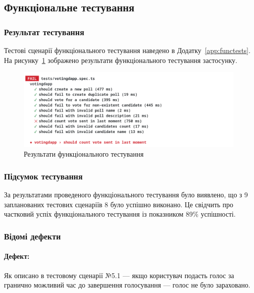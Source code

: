 \documentclass[14pt]{extreport}
\begin{document}
  \subsection{Функціональне тестування}
  
  \subsubsection*{Результат тестування}
  
  Тестові сценарії функціонального тестування наведено в Додатку~\ref{app:functests}. На рисунку~\ref{fig:functests} зображено результати функціонального тестування застосунку.

  \begin{figure}[H]
    \centering
    \includegraphics[width=\textwidth]{FuncTests}
    \caption{Результати функціонального тестування}
    \label{fig:functests}
  \end{figure}
  
  \subsubsection*{Підсумок тестування}
  
  За результатами проведеного функціонального тестування було виявлено, що з 9 запланованих тестових сценаріїв 8 було успішно виконано. Це свідчить про частковий успіх функціонального тестування із показником 89\% успішності.
  
  \subsubsection*{Відомі дефекти}

  \paragraph{Дефект:} Як описано в тестовому сценарії №5.1 --- якщо користувач подасть голос за гранично можливий час до завершення голосування --- голос не було зараховано.
\end{document}

